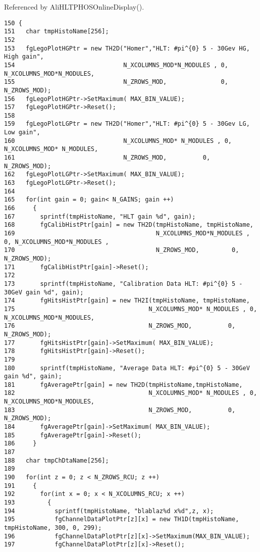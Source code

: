 Referenced by Ali\-HLTPHOSOnline\-Display().

\footnotesize\begin{verbatim}150 {
151   char tmpHistoName[256];
152 
153   fgLegoPlotHGPtr = new TH2D("Homer","HLT: #pi^{0} 5 - 30Gev HG, High gain",  
154                              N_XCOLUMNS_MOD*N_MODULES , 0, N_XCOLUMNS_MOD*N_MODULES,  
155                              N_ZROWS_MOD,               0, N_ZROWS_MOD);
156   fgLegoPlotHGPtr->SetMaximum( MAX_BIN_VALUE);
157   fgLegoPlotHGPtr->Reset();
158 
159   fgLegoPlotLGPtr = new TH2D("Homer","HLT: #pi^{0} 5 - 30Gev LG, Low gain",  
160                              N_XCOLUMNS_MOD* N_MODULES , 0, N_XCOLUMNS_MOD* N_MODULES,  
161                              N_ZROWS_MOD,          0, N_ZROWS_MOD);
162   fgLegoPlotLGPtr->SetMaximum( MAX_BIN_VALUE); 
163   fgLegoPlotLGPtr->Reset();
164 
165   for(int gain = 0; gain< N_GAINS; gain ++)
166     {
167       sprintf(tmpHistoName, "HLT gain %d", gain);
168       fgCalibHistPtr[gain] = new TH2D(tmpHistoName, tmpHistoName,  
169                                       N_XCOLUMNS_MOD*N_MODULES , 0, N_XCOLUMNS_MOD*N_MODULES , 
170                                       N_ZROWS_MOD,         0, N_ZROWS_MOD);
171       fgCalibHistPtr[gain]->Reset(); 
172      
173       sprintf(tmpHistoName, "Calibration Data HLT: #pi^{0} 5 - 30GeV gain %d", gain);
174       fgHitsHistPtr[gain] = new TH2I(tmpHistoName, tmpHistoName,  
175                                     N_XCOLUMNS_MOD* N_MODULES , 0, N_XCOLUMNS_MOD*N_MODULES,  
176                                     N_ZROWS_MOD,          0, N_ZROWS_MOD);
177       fgHitsHistPtr[gain]->SetMaximum( MAX_BIN_VALUE); 
178       fgHitsHistPtr[gain]->Reset();
179 
180       sprintf(tmpHistoName, "Average Data HLT: #pi^{0} 5 - 30GeV gain %d", gain);
181       fgAveragePtr[gain] = new TH2D(tmpHistoName,tmpHistoName,  
182                                     N_XCOLUMNS_MOD* N_MODULES , 0, N_XCOLUMNS_MOD*N_MODULES,  
183                                     N_ZROWS_MOD,          0, N_ZROWS_MOD);
184       fgAveragePtr[gain]->SetMaximum( MAX_BIN_VALUE); 
185       fgAveragePtr[gain]->Reset();
186     }
187 
188   char tmpChDtaName[256];
189 
190   for(int z = 0; z < N_ZROWS_RCU; z ++)
191     {
192       for(int x = 0; x < N_XCOLUMNS_RCU; x ++)
193         {
194           sprintf(tmpHistoName, "blablaz%d x%d",z, x);
195           fgChannelDataPlotPtr[z][x] = new TH1D(tmpHistoName, tmpHistoName, 300, 0, 299);
196           fgChannelDataPlotPtr[z][x]->SetMaximum(MAX_BIN_VALUE); 
197           fgChannelDataPlotPtr[z][x]->Reset();

\end{verbatim}
